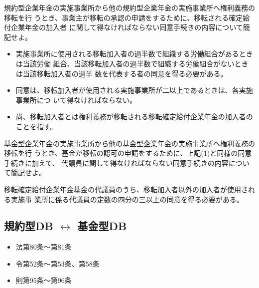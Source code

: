 \begin{shortanswer}[数理人試験 H23 問題2(1)]
  規約型企業年金の実施事業所から他の規約型企業年金の実施事業所へ権利義務の移転を行
  うとき、事業主が移転の承認の申請をするために、移転される確定給付企業年金の加入者
  に関して得なければならない同意手続きの内容について簡記せよ。
\end{shortanswer}

\begin{answerbox}
  \begin{itemize}
    \item 実施事業所に使用される移転加入者の過半数で組織する労働組合があるときは当該労働
 組合、当該移転加入者の過半数で組織する労働組合がないときは当該移転加入者の過半
 数を代表する者の同意を得る必要がある。
    \item 同意は、移転加入者が使用される実施事業所が二以上であるときは、各実施事業所につ
 いて得なければならない。
    \item 尚、移転加入者とは権利義務が移転される移転確定給付企業年金の加入者のことを指す。
  \end{itemize}
\end{answerbox}

\begin{shortanswer}[数理人試験 H23 問題2(2)]
  基金型企業年金の実施事業所から他の基金型企業年金の実施事業所へ権利義務の移転を行
  うとき、基金が移転の認可の申請をするために、上記(1)と同様の同意手続きに加えて、
  代議員に関して得なければならない同意手続きの内容について簡記せよ。
\end{shortanswer}

\begin{answerbox}
  移転確定給付企業年金基金の代議員のうち、移転加入者以外の加入者が使用される実施事
業所に係る代議員の定数の四分の三以上の同意を得る必要がある。
\end{answerbox}

\newpage

\subsection{規約型DB $\leftrightarrow$ 基金型DB}


\begin{InyouJobunbox}
  \begin{itemize}
    \item 法第80条〜第81条
    \item 令第52条〜第53条、第58条
    \item 則第95条〜第96条
  \end{itemize}
\end{InyouJobunbox}

